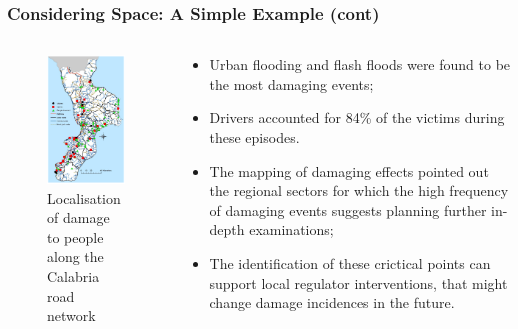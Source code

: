 \documentclass[hyperref={pdfpagelabels=true}]{beamer}
\begin{document}
\begin{frame}
\frametitle{Considering Space: A Simple Example (cont)}
\begin{columns}
  \begin{column}{0.5\textwidth}
    \begin{figure}
    \includegraphics[scale=0.4]{damage2.png}
    \caption{\tiny{ Localisation of damage to people along the Calabria road network~\cite{calabria}}}    
    \end{figure}
  \end{column}
  \begin{column}{0.5\textwidth}  
  \small{
  \begin{itemize}
  \item Urban flooding and flash floods were found to be the most damaging events;
  \item Drivers accounted for 84\% of the victims during these episodes.
  \item The mapping of damaging effects pointed out the regional sectors for which the high frequency of damaging events suggests planning further in-depth examinations; 
  \item The identification of these crictical points can support local regulator interventions, that might change damage incidences in the future.
  \end{itemize} }
  \end{column}
\end{columns}
\end{frame}
\end{document}
